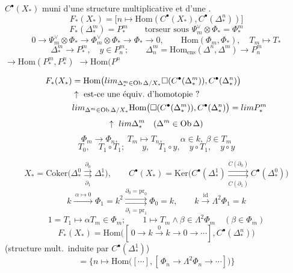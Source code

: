 \documentclass[11pt,a4paper]{article}
\begin{document}
$C^\bullet(X_*)$ muni d’une structure multiplicative et d’une  \ill{}.
\[
F_*(X_*) = \bigl[ n \mapsto \mathrm{Hom}(C^\bullet(X_*) , C^\bullet(\Delta^n_*)) \bigr]
\]
\[
F_*(\Delta^m_*) = P^m_* \qquad \text{torseur sous } \Psi^\vee_m \otimes \Phi_* = \Phi^m_*
\]
\[
0 \longrightarrow \Psi^\vee_m \otimes \Phi_* \longrightarrow \Phi^\vee_m \otimes \Phi_* \longrightarrow \Phi_* \longrightarrow 0 ,
\qquad \mathrm{Hom}(\Phi_m , \Phi_*) , \quad T_m \mapsto T_*
\]
\[
\Delta^m_* \longrightarrow P^m_* , \quad y \in P^m_n ;
\qquad \Delta^m_n = \mathrm{Hom}_{\mathrm{ens}}(\Delta^n , \Delta^m) \longrightarrow P^m_n
\]
$\longrightarrow \mathrm{Hom}(P^m_* , P^n_*)$ \qquad $\longrightarrow \mathrm{Hom}(P^n$ \ill{}

\[
\begin{aligned}
F_*(X_*) &= \mathrm{Hom}\bigl( \varprojlim_{\Delta^m_* \in \mathrm{Ob}\, \Delta/X_*} \Box(C^\bullet(\Delta^m_*)) , C^\bullet(\Delta^n_*) \bigr) \\
&\uparrow \text{ est-ce une équiv.\ d’homotopie ?} \\
&\varinjlim_{\Delta^m \in \mathrm{Ob}\, \Delta/X_*} \mathrm{Hom}\bigl( \Box(C^\bullet(\Delta^m_*)) , C^\bullet(\Delta^n_*) \bigr) = \varinjlim P^m_*
\end{aligned}
\]
\[
\uparrow \ \varinjlim \Delta^m_* \quad (\Delta^m \in \mathrm{Ob}\, \Delta)
\]
\[
\Phi_m \longrightarrow \Phi_n , \quad T_m \mapsto T_n , \qquad \alpha \in k , \ \beta \in T_m
\]
\[
T_0 , \quad T_1 \circ T_1 ; \qquad y , \quad T_1 \circ y , \quad y \circ T_1 , \quad y \circ y
\]

\[
X_* = \mathrm{Coker}\bigl( \Delta^0_* \overset{\partial_0}{\underset{\partial_1}{\rightrightarrows}} \Delta^1_* \bigr) ,
\qquad
C^\bullet(X_*) = \mathrm{Ker}\bigl( C^\bullet(\Delta^1_*) \overset{C(\partial_0)}{\underset{C(\partial_1)}{\rightrightarrows}} C^\bullet(\Delta^0_*) \bigr)
\]
\[
k \xrightarrow{\;\alpha \mapsto 0\;} \Phi_1 = k^2 \overset{\partial_0 = \mathrm{pr}_0}{\underset{\partial_1 = \mathrm{pr}_1}{\rightrightarrows}} \Phi_0 = k ,
\qquad
k \xrightarrow{\;\mathrm{id}\;} \Lambda^2 \Phi_1 = k
\]
\[
1 = T_1 \longmapsto \alpha T_m \in \Phi_m ;
\qquad
1 \longmapsto T_m \wedge \beta \in \Lambda^2 \Phi_m \quad (\beta \in \Phi_m)
\]
\[
F_*(X_*) = \mathrm{Hom}\bigl( [\, 0 \to k \xrightarrow{0} k \to 0 \to \cdots ] , C^\bullet(\Delta^n_*) \bigr)
\]
(structure mult.\ induite par $C^\bullet(\Delta^1_*)$)
\[
= \bigl\{ n \mapsto \mathrm{Hom}\bigl( [\cdots] , [\, \Phi_n \to \Lambda^2 \Phi_n \to \cdots ] \bigr) \bigr\}
\]
\end{document}
